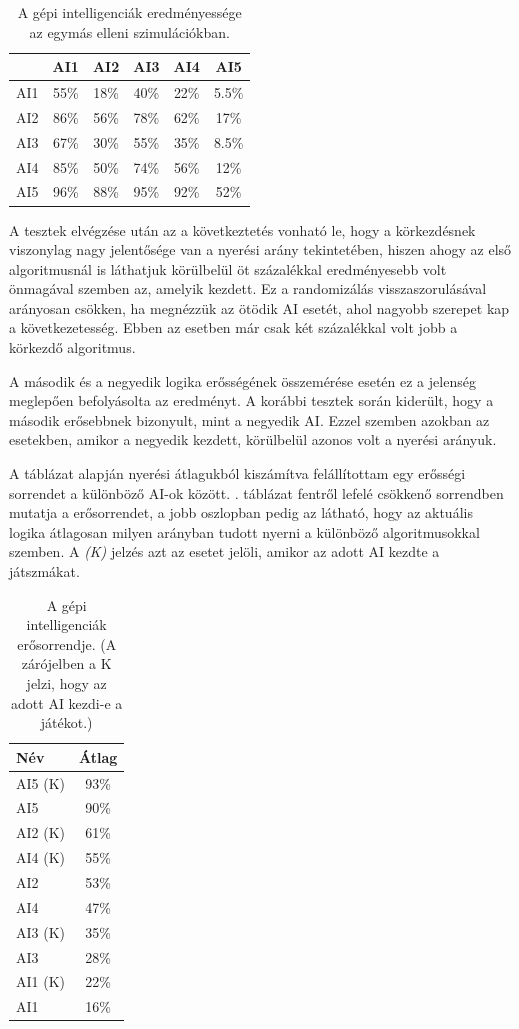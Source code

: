 \begin{table}[h]
\caption{A gépi intelligenciák eredményessége az egymás elleni szimulációkban.}
\label{tab:ai_comparison}
\medskip
\centering
\begin{tabular}{|c|c|c|c|c|c|} 
 \hline
  & AI1 & AI2 & AI3 & AI4 & AI5 \\ 
 \hline
 AI1 & 55\% & 18\% & 40\% & 22\% & 5.5\%\\ 
 \hline
 AI2 & 86\% & 56\% & 78\% & 62\% & 17\%\\ 
 \hline
 AI3 & 67\% & 30\% & 55\% & 35\% & 8.5\%\\ 
 \hline
 AI4 & 85\% & 50\% & 74\% & 56\% & 12\%\\ 
 \hline
 AI5 & 96\% & 88\% & 95\% & 92\% & 52\%\\
 \hline
\end{tabular}
\end{table}

A tesztek elvégzése után az a következtetés vonható le, hogy a körkezdésnek viszonylag nagy jelentősége van a nyerési arány tekintetében, hiszen ahogy az első algoritmusnál is láthatjuk körülbelül öt százalékkal eredményesebb volt önmagával szemben az, amelyik kezdett. Ez a randomizálás visszaszorulásával arányosan csökken, ha megnézzük az ötödik AI esetét, ahol nagyobb szerepet kap a következetesség. Ebben az esetben már csak két százalékkal volt jobb a körkezdő algoritmus.

A második és a negyedik logika erősségének összemérése esetén ez a jelenség meglepően befolyásolta az eredményt. A korábbi tesztek során kiderült, hogy a második erősebbnek bizonyult, mint a negyedik AI. Ezzel szemben azokban az esetekben, amikor a negyedik kezdett, körülbelül azonos volt a nyerési arányuk.

A táblázat alapján nyerési átlagukból kiszámítva felállítottam egy erősségi sorrendet a különböző AI-ok között. . táblázat fentről lefelé csökkenő sorrendben mutatja a erősorrendet, a jobb oszlopban pedig az látható, hogy az aktuális logika átlagosan milyen arányban tudott nyerni a különböző algoritmusokkal szemben. A \textit{(K)} jelzés azt az esetet jelöli, amikor az adott AI kezdte a játszmákat.

\begin{table}[h]
\caption{A gépi intelligenciák erősorrendje. (A zárójelben a K jelzi, hogy az adott AI kezdi-e a játékot.)}
\label{tab:ai_ranking}
\medskip
\centering
\begin{tabular}{|l|c|} 
\hline
Név & Átlag \\
 \hline
 AI5 (K) & 93\%\\ 
 \hline
 AI5 & 90\%\\ 
 \hline
 AI2 (K) & 61\%\\ 
 \hline
 AI4 (K) & 55\%\\ 
 \hline
 AI2 & 53\%\\
 \hline
  AI4 & 47\%\\ 
 \hline
 AI3 (K) & 35\%\\ 
 \hline
 AI3 & 28\%\\ 
 \hline
 AI1 (K) & 22\%\\ 
 \hline
 AI1 & 16\%\\
 \hline
\end{tabular}
\end{table}